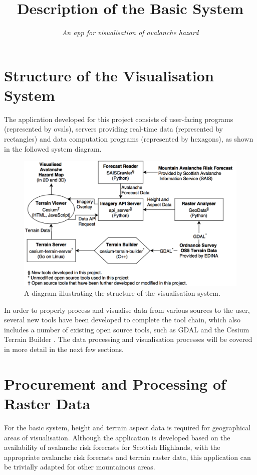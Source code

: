 \documentclass[11pt, oneside]{article}
\title{\vspace{-1.6cm}Description of the Basic System}
\author{\textit{An app for visualisation of avalanche hazard}}
\date{}
\begin{document}
\maketitle

\section{Structure of the Visualisation System}

The application developed for this project consists of user-facing programs (represented by ovals), servers providing real-time data (represented by rectangles) and data computation programs (represented by hexagons), as shown in the followed system diagram.

\begin{figure}[h]
\centering
\includegraphics[scale=0.3]{System.png}
\caption{A diagram illustrating the structure of the visualisation system.}
\end{figure}

In order to properly process and visualise data from various sources to the user, several new tools have been developed to complete the tool chain, which also includes a number of existing open source tools, such as GDAL\cite{GDAL} and the Cesium Terrain Builder \cite{cesium-terrain-builder}. The data processing and visualisation processes will be covered in more detail in the next few sections.

\section{Procurement and Processing of Raster Data}
	For the basic system, height and terrain aspect data is required for geographical areas of visualisation. Although the application is developed based on the availability of avalanche risk forecasts for Scottish Highlands, with the appropriate avalanche risk forecasts and terrain raster data, this application can be trivially adapted for other mountainous areas.
	
\end{document}
